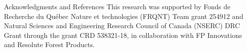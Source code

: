 \documentclass[final,hyperref={pdfpagelabels=false}]{beamer}
\begin{document}
\begin{frame}[t]
\begin{block}{Acknowledgments and References}
	\footnotesize%
	\noindent This research was supported by Fonds de Recherche du Québec Nature et technologies (FRQNT) Team grant 254912 and Natural Sciences and Engineering Research Council of Canada (NSERC) DRC Grant through the grant CRD 538321-18, in collaboration with FP Innovations and Resolute Forest Products.
	{\footnotesize}
\end{block}

\end{frame} %
\end{document}
